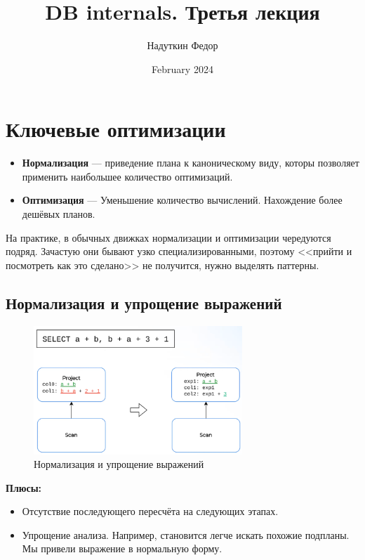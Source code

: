 \documentclass[11pt]{article}
\title{DB internals. Третья лекция}
\author{Надуткин Федор }
\date{February 2024}
\begin{document}
    \maketitle
    \newpage

    \section*{Ключевые оптимизации}

    \begin{itemize}
        \item \textbf{Нормализация} --- приведение плана к каноническому виду, которы позволяет применить наибольшее количество оптимизаций.
        \item \textbf{Оптимизация} --- Уменьшение количество вычислений.
        Нахождение более дешёвых планов.
    \end{itemize}

    На практике, в обычных движках нормализации и оптимизации чередуются подряд.
    Зачастую они бывают узко специализированными, поэтому <<прийти и посмотреть как это сделано>> не получится, нужно выделять паттерны.

    \subsection*{Нормализация и упрощение выражений}

    \begin{figure}[h!]
        \centering
        \includegraphics*[width=0.7\textwidth]{Pictures/Ключевые оптимизации/Нормализация и упрощение выражений}
        \caption{Нормализация и упрощение выражений}
    \end{figure}

    \textbf{Плюсы:}
    \begin{itemize}[label=+]
        \item Отсутствие последующего пересчёта на следующих этапах.
        \item Упрощение анализа.
        Например, становится легче искать похожие подпланы.
        Мы привели выражение в нормальную форму.
    \end{itemize}
\end{document}
